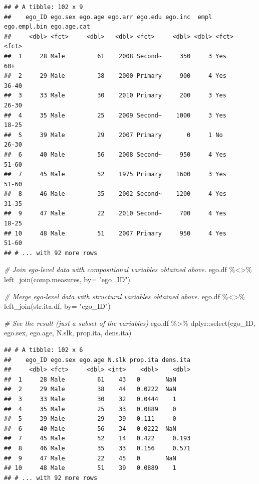 \documentclass[
]{book}
\newenvironment{Shaded}{\begin{snugshade}}{\end{snugshade}}
\newcommand{\AttributeTok}[1]{\textcolor[rgb]{0.77,0.63,0.00}{#1}}
\newcommand{\CommentTok}[1]{\textcolor[rgb]{0.56,0.35,0.01}{\textit{#1}}}
\newcommand{\FunctionTok}[1]{\textcolor[rgb]{0.00,0.00,0.00}{#1}}
\newcommand{\NormalTok}[1]{#1}
\newcommand{\SpecialCharTok}[1]{\textcolor[rgb]{0.00,0.00,0.00}{#1}}
\newcommand{\StringTok}[1]{\textcolor[rgb]{0.31,0.60,0.02}{#1}}
\begin{document}
\begin{verbatim}
## # A tibble: 102 x 9
##    ego_ID ego.sex ego.age ego.arr ego.edu ego.inc  empl ego.empl.bin ego.age.cat
##     <dbl> <fct>     <dbl>   <dbl> <fct>     <dbl> <dbl> <fct>        <fct>      
##  1     28 Male         61    2008 Second~     350     3 Yes          60+        
##  2     29 Male         38    2000 Primary     900     4 Yes          36-40      
##  3     33 Male         30    2010 Primary     200     3 Yes          26-30      
##  4     35 Male         25    2009 Second~    1000     3 Yes          18-25      
##  5     39 Male         29    2007 Primary       0     1 No           26-30      
##  6     40 Male         56    2008 Second~     950     4 Yes          51-60      
##  7     45 Male         52    1975 Primary    1600     3 Yes          51-60      
##  8     46 Male         35    2002 Second~    1200     4 Yes          31-35      
##  9     47 Male         22    2010 Second~     700     4 Yes          18-25      
## 10     48 Male         51    2007 Primary     950     4 Yes          51-60      
## # ... with 92 more rows
\end{verbatim}

\begin{Shaded}
\begin{Highlighting}[]
\CommentTok{\# Join ego{-}level data with compositional variables obtained above.}
\NormalTok{ego.df }\SpecialCharTok{\%\textless{}\textgreater{}\%} 
  \FunctionTok{left\_join}\NormalTok{(comp.measures, }\AttributeTok{by=} \StringTok{"ego\_ID"}\NormalTok{)}

\CommentTok{\# Merge ego{-}level data with structural variables obtained above.}
\NormalTok{ego.df }\SpecialCharTok{\%\textless{}\textgreater{}\%}
  \FunctionTok{left\_join}\NormalTok{(str.ita.df, }\AttributeTok{by=} \StringTok{"ego\_ID"}\NormalTok{)}

\CommentTok{\# See the result (just a subset of the variables)}
\NormalTok{ego.df }\SpecialCharTok{\%\textgreater{}\%}
\NormalTok{  dplyr}\SpecialCharTok{::}\FunctionTok{select}\NormalTok{(ego\_ID, ego.sex, ego.age, N.slk, prop.ita, dens.ita)}
\end{Highlighting}
\end{Shaded}

\begin{verbatim}
## # A tibble: 102 x 6
##    ego_ID ego.sex ego.age N.slk prop.ita dens.ita
##     <dbl> <fct>     <dbl> <int>    <dbl>    <dbl>
##  1     28 Male         61    43   0       NaN    
##  2     29 Male         38    44   0.0222  NaN    
##  3     33 Male         30    32   0.0444    1    
##  4     35 Male         25    33   0.0889    0    
##  5     39 Male         29    39   0.111     0    
##  6     40 Male         56    34   0.0222  NaN    
##  7     45 Male         52    14   0.422     0.193
##  8     46 Male         35    33   0.156     0.571
##  9     47 Male         22    45   0       NaN    
## 10     48 Male         51    39   0.0889    1    
## # ... with 92 more rows
\end{verbatim}
\end{document}
